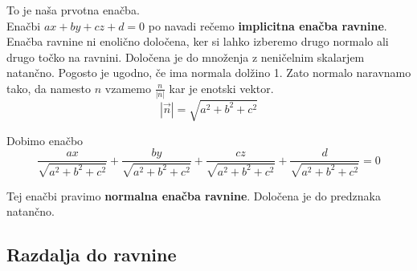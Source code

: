\documentclass[a4paper,12pt]{article}
\begin{document}
\begin{itemize}
To je naša prvotna enačba. \\

Enačbi $ax+by+cz+d=0$ po navadi rečemo \textbf{implicitna enačba ravnine}. \\

Enačba ravnine ni enolično določena, ker si lahko izberemo drugo normalo ali drugo točko na ravnini. Določena je do množenja z neničelnim skalarjem natančno. Pogosto je ugodno, če ima normala dolžino 1. Zato normalo naravnamo tako, da namesto $n$ vzamemo $\frac{n}{|\overline{n}|}$ kar je enotski vektor. $$ |\vec{n}|=\sqrt{a^2+b^2+c^2} $$

Dobimo enačbo $$\frac{ax}{\sqrt{a^2+b^2+c^2}} + \frac{by}{\sqrt{a^2+b^2+c^2}} + \frac{cz}{\sqrt{a^2+b^2+c^2}} + \frac{d}{\sqrt{a^2+b^2+c^2}} = 0 $$

Tej enačbi pravimo \textbf{normalna enačba ravnine}. Določena je do predznaka natančno. \\
\end{itemize}

\newpage

\begin{center}
\subsection{Razdalja do ravnine}
\end{center}
\end{document}
